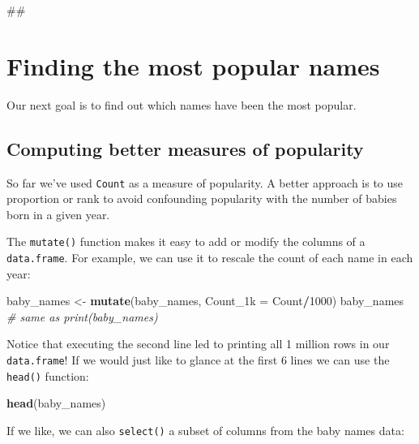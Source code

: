\documentclass[]{book}
\newenvironment{Shaded}{\begin{snugshade}}{\end{snugshade}}
\newcommand{\KeywordTok}[1]{\textcolor[rgb]{0.13,0.29,0.53}{\textbf{#1}}}
\newcommand{\DataTypeTok}[1]{\textcolor[rgb]{0.13,0.29,0.53}{#1}}
\newcommand{\DecValTok}[1]{\textcolor[rgb]{0.00,0.00,0.81}{#1}}
\newcommand{\StringTok}[1]{\textcolor[rgb]{0.31,0.60,0.02}{#1}}
\newcommand{\CommentTok}[1]{\textcolor[rgb]{0.56,0.35,0.01}{\textit{#1}}}
\newcommand{\OperatorTok}[1]{\textcolor[rgb]{0.81,0.36,0.00}{\textbf{#1}}}
\newcommand{\NormalTok}[1]{#1}
\begin{document}
\begin{Shaded}
\begin{Highlighting}[]
\NormalTok{##}
\end{Highlighting}
\end{Shaded}

\section{Finding the most popular
names}\label{finding-the-most-popular-names}

Our next goal is to find out which names have been the most popular.

\subsection{Computing better measures of
popularity}\label{computing-better-measures-of-popularity}

So far we've used \texttt{Count} as a measure of popularity. A better
approach is to use proportion or rank to avoid confounding popularity
with the number of babies born in a given year.

The \texttt{mutate()} function makes it easy to add or modify the
columns of a \texttt{data.frame}. For example, we can use it to rescale
the count of each name in each year:

\begin{Shaded}
\begin{Highlighting}[]
\NormalTok{baby_names <-}\StringTok{ }\KeywordTok{mutate}\NormalTok{(baby_names, }\DataTypeTok{Count_1k =}\NormalTok{ Count}\OperatorTok{/}\DecValTok{1000}\NormalTok{)}
\NormalTok{baby_names }\CommentTok{# same as print(baby_names)}
\end{Highlighting}
\end{Shaded}

Notice that executing the second line led to printing all 1 million rows
in our \texttt{data.frame}! If we would just like to glance at the first
6 lines we can use the \texttt{head()} function:

\begin{Shaded}
\begin{Highlighting}[]
\KeywordTok{head}\NormalTok{(baby_names) }
\end{Highlighting}
\end{Shaded}

If we like, we can also \texttt{select()} a subset of columns from the
baby names data:
\end{document}
